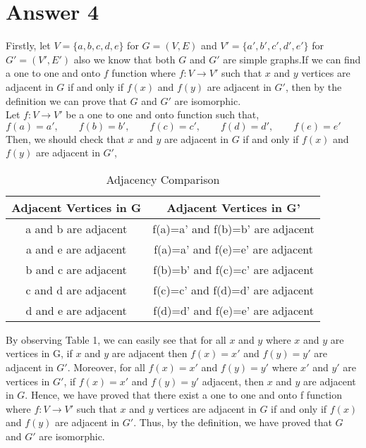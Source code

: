 \documentclass[11pt]{article}
\begin{document}
\section*{Answer 4}
Firstly, let $V = \{a,b,c,d,e\}$ for $G=(V,E)$ and $V'= \{a',b',c',d',e'\}$ for $G'=(V',E')$ also we know that both $G$ and $G'$ are simple graphs.If we can find a one to one and onto $f$ function where $f:V \rightarrow V'$ such that $x$ and $y$ vertices are adjacent in $G$ if and only if $f(x)$ and $f(y)$ are adjacent in $G'$, then by the definition we can prove that $G$ and $G'$ are isomorphic. \\
Let $f:V \rightarrow V'$ be a one to one and onto function such that, 
\begin{equation*}
f(a) = a', \qquad
f(b) = b', \qquad
f(c) = c', \qquad
f(d) = d', \qquad
f(e) = e' \qquad
\end{equation*}
Then, we should check that $x$ and $y$ are adjacent in $G$ if and only if $f(x)$ and $f(y)$ are adjacent in $G'$, \\
\begin{table}[H]
	\centering
	\caption{Adjacency Comparison}
	\vspace{5px}
	\label{my-label1}
	\begin{tabular}{|c|c|}
		\hline
		Adjacent Vertices in G&Adjacent Vertices in G'\\ \hline
		a and b are adjacent&f(a)=a' and f(b)=b' are adjacent\\ \hline
		a and e are adjacent&f(a)=a' and f(e)=e' are adjacent\\ \hline
		b and c are adjacent&f(b)=b' and f(c)=c' are adjacent\\ \hline
		c and d are adjacent&f(c)=c' and f(d)=d' are adjacent\\ \hline
		d and e are adjacent&f(d)=d' and f(e)=e' are adjacent\\ \hline
	\end{tabular}
\end{table}  
By observing Table 1, we can easily see that for all $x$ and $y$ where $x$ and $y$
are vertices in G, if $x$ and $y$ are adjacent then $f(x)=x'$ and $f(y)=y'$ are adjacent in $G'$. Moreover, for all $f(x)=x'$ and $f(y)=y'$ where $x'$ and $y'$ are vertices in $G'$, if $f(x)=x'$ and $f(y)=y'$ adjacent, then $x$ and $y$ are adjacent in $G$. Hence, we have proved that there exist a one to one and onto f function where $f:V \rightarrow V'$ such that $x$ and $y$ vertices are adjacent in $G$ if and only if $f(x)$ and $f(y)$ are adjacent in $G'$. Thus, by the definition, we have proved that $G$ and $G'$ are isomorphic.
\end{document}

